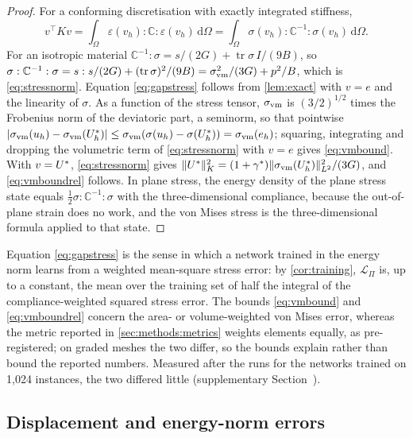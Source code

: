 \begin{proof}
For a conforming discretisation with exactly integrated stiffness,
\begin{equation}
v^{\top}Kv=\int_\Omega\varepsilon(v_h):\mathbb{C}:\varepsilon(v_h)\,\mathrm{d}\Omega
=\int_\Omega\sigma(v_h):\mathbb{C}^{-1}:\sigma(v_h)\,\mathrm{d}\Omega .
\label{eq:kcompliance}
\end{equation}
For an isotropic
material $\mathbb{C}^{-1}:\sigma=s/(2G)+\operatorname{tr}\sigma\,I/(9B)$, so
$\sigma:\mathbb{C}^{-1}:\sigma=s:s/(2G)+(\operatorname{tr}\sigma)^2/(9B)
=\sigma_{\mathrm{vm}}^2/(3G)+p^2/B$, which is \eqref{eq:stressnorm}. Equation \eqref{eq:gapstress}
follows from \cref{lem:exact} with $v=e$ and the linearity of $\sigma$. As a function of
the stress tensor, $\sigma_{\mathrm{vm}}$ is $(3/2)^{1/2}$ times the Frobenius norm of the deviatoric part,
a seminorm, so that pointwise
$\lvert\sigma_{\mathrm{vm}}(u_h)-\sigma_{\mathrm{vm}}(U^{\ast}_h)\rvert\le\sigma_{\mathrm{vm}}(\sigma(u_h)-\sigma(U^{\ast}_h))=\sigma_{\mathrm{vm}}(e_h)$;
squaring, integrating and dropping the volumetric term of \eqref{eq:stressnorm} with $v=e$
gives \eqref{eq:vmbound}. With $v=U^{\ast}$, \eqref{eq:stressnorm} gives
$\lVert U^{\ast}\rVert_K^2=(1+\gamma^\ast)\lVert\sigma_{\mathrm{vm}}(U^{\ast}_h)\rVert_{L^2}^2/(3G)$, and
\eqref{eq:vmboundrel} follows. In plane stress, the energy density of the plane stress
state equals $\tfrac12\sigma:\mathbb{C}^{-1}:\sigma$ with the three-dimensional compliance,
because the out-of-plane strain does no work, and the von Mises stress is the
three-dimensional formula applied to that state.
\end{proof}

Equation \eqref{eq:gapstress} is the sense in which a network trained in the energy norm
learns from a weighted mean-square stress error: by \cref{cor:training}, $\mathcal{L}_\Pi$
is, up to a constant, the mean over the training set of half the integral of the
compliance-weighted squared stress error. The bounds \eqref{eq:vmbound} and
\eqref{eq:vmboundrel} concern the area- or volume-weighted von Mises error, whereas the
metric reported in \cref{sec:methods:metrics} weights elements equally, as pre-registered;
on graded meshes the two differ, so the bounds explain rather than bound the reported
numbers. Measured after the runs for the networks trained on 1,024 instances, the two
differed little (supplementary Section~\SuppRepro).

\subsection{Displacement and energy-norm errors}\label{sec:theory:metrics}

